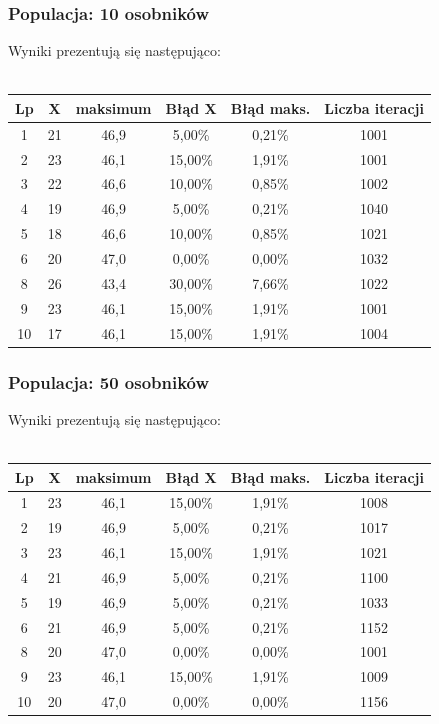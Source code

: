\documentclass[a4paper,11pt]{article}
\begin{document}
			\subsubsection{Populacja: 10 osobników}
				Wyniki prezentują się następująco:\\~\\
				\begin{tabular}{|c|c|c|c|c|c|}
					\hline 
					Lp & X & maksimum & Błąd X & Błąd maks. & Liczba iteracji\\\hline
					1 & 21 & 46,9 & 5,00\% &0,21\%  &1001\\\hline
					2 & 23 & 46,1 & 15,00\% & 1,91\% &1001 \\\hline
					3 & 22 & 46,6 & 10,00\% &0,85\% &1002 \\\hline
					4 & 19 & 46,9 & 5,00\% & 0,21\%&1040 \\\hline
					5 & 18 & 46,6 & 10,00\% & 0,85\%&1021 \\\hline
					6 & 20 & 47,0 & 0,00\% & 0,00\%& 1032 \\\hline
					8 & 26 & 43,4 & 30,00\% & 7,66\%& 1022 \\\hline
					9 & 23 & 46,1 & 15,00\% & 1,91\%& 1001 \\\hline
					10 & 17 & 46,1&15,00\%  & 1,91\%& 1004 \\\hline
				\end{tabular} 
			\subsubsection{Populacja: 50 osobników}
				Wyniki prezentują się następująco:\\~\\
				\begin{tabular}{|c|c|c|c|c|c|}
					\hline 
					Lp & X & maksimum & Błąd X & Błąd maks. & Liczba iteracji \\
					\hline
					1 & 23 & 46,1 & 15,00\% & 1,91\%& 1008\\\hline
					2 & 19 & 46,9 & 5,00\% & 0,21\%& 1017\\\hline
					3 & 23 & 46,1 & 15,00\% & 1,91\% & 1021 \\\hline
					4 & 21 & 46,9 & 5,00\% & 0,21\% & 1100\\\hline
					5 & 19 & 46,9 & 5,00\% & 0,21\% & 1033\\\hline
					6 & 21 & 46,9 & 5,00\% & 0,21\% & 1152\\\hline
					8 & 20 & 47,0 & 0,00\% & 0,00\% & 1001\\\hline
					9 & 23 & 46,1 & 15,00\% &1,91\%  & 1009\\\hline
					10& 20 & 47,0 & 0,00\% & 0,00\% & 1156 \\\hline
				\end{tabular} 
\end{document}
